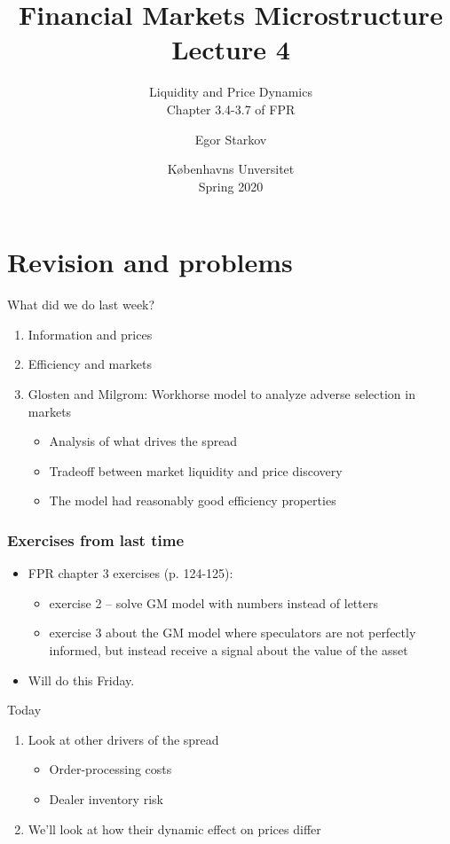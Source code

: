 \documentclass[english,10pt]{beamer}
\title{Financial Markets Microstructure \\ Lecture 4}
\subtitle{Liquidity and Price Dynamics\\
Chapter 3.4-3.7 of FPR}
\author{Egor Starkov}
\date{K{\o}benhavns Unversitet \\
	Spring 2020}
\begin{document}
	

\frame[plain]{\titlepage}


\section{Revision and problems}

\begin{frame}{What did we do last week?}
\begin{enumerate}
	\item Information and prices
	\item Efficiency and markets
	\item Glosten and Milgrom: Workhorse model to analyze adverse selection in markets
	\begin{itemize}
	\item Analysis of what drives the spread
	\item Tradeoff between market liquidity and price discovery
	\item The model had reasonably good efficiency properties
	\end{itemize}
\end{enumerate}
\end{frame}


\begin{frame}[label=exercises]
\frametitle{Exercises from last time}
\begin{itemize}
	\item FPR chapter 3 exercises (p. 124-125):
	\begin{itemize}
		\item exercise 2 -- solve GM model with numbers instead of letters
		\item exercise 3 about the GM model where speculators are not perfectly informed, but instead receive a signal about the value of the asset
	\end{itemize}
	\item Will do this Friday.
\end{itemize}
\end{frame}


\begin{frame}{Today}
\begin{enumerate}
	\item Look at other drivers of the spread
	\begin{itemize}
		\item Order-processing costs
		\item Dealer inventory risk
	\end{itemize}
	\item We'll look at how their dynamic effect on prices differ
\end{enumerate}
\end{frame}
\end{document}
